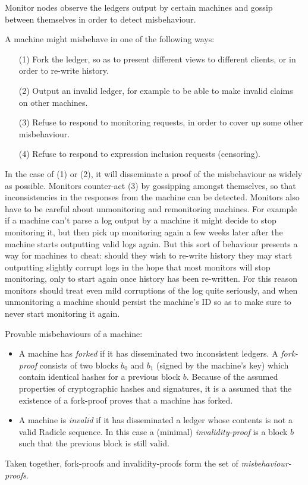 \documentclass[a4paper, oneside, 10pt]{amsart}
\begin{document}
Monitor nodes observe the ledgers output by certain machines and gossip between
themselves in order to detect misbehaviour.

A machine might misbehave in one of the following ways:
\begin{itemize}
\item[(1)]
  Fork the ledger, so as to present different views to different clients, or in
  order to re-write history.
\item[(2)]
  Output an invalid ledger, for example to be able to make invalid claims on
  other machines.
\item[(3)]
  Refuse to respond to monitoring requests, in order to cover up some other
  misbehaviour.
\item[(4)]
  Refuse to respond to expression inclusion requests (censoring).
\end{itemize}

In the case of (1) or (2), it will disseminate a proof of the misbehaviour as
widely as possible. Monitors counter-act (3) by gossipping amongst themselves,
so that inconsistencies in the responses from the machine can be
detected. Monitors also have to be careful about unmonitoring and remonitoring
machines. For example if a machine can't parse a log output by a machine it
might decide to stop monitoring it, but then pick up monitoring again a few
weeks later after the machine starts outputting valid logs again. But this sort
of behaviour presents a way for machines to cheat: should they wish to re-write
history they may start outputting slightly corrupt logs in the hope that most
monitors will stop monitoring, only to start again once history has been
re-written. For this reason monitors should treat even mild corruptions of the
log quite seriously, and when unmonitoring a machine should persist the
machine's ID so as to make sure to never start monitoring it again.

Provable misbehaviours of a machine:
\begin{itemize}
\item
  A machine has \emph{forked} if it has disseminated two inconsistent ledgers. A
  \emph{fork-proof} consists of two blocks $b_0$ and $b_1$ (signed by the
  machine's key) which contain identical hashes for a previous block
  $b$. Because of the assumed properties of cryptographic hashes and signatures,
  it is a assumed that the existence of a fork-proof proves that a machine has
  forked.
\item
  A machine is \emph{invalid} if it has disseminated a ledger whose contents is
  not a valid Radicle sequence. In this case a (minimal) \emph{invalidity-proof}
  is a block $b$ such that the previous block is still valid.
\end{itemize}
Taken together, fork-proofs and invalidity-proofs form the set of
\emph{misbehaviour-proofs}.
\end{document}
